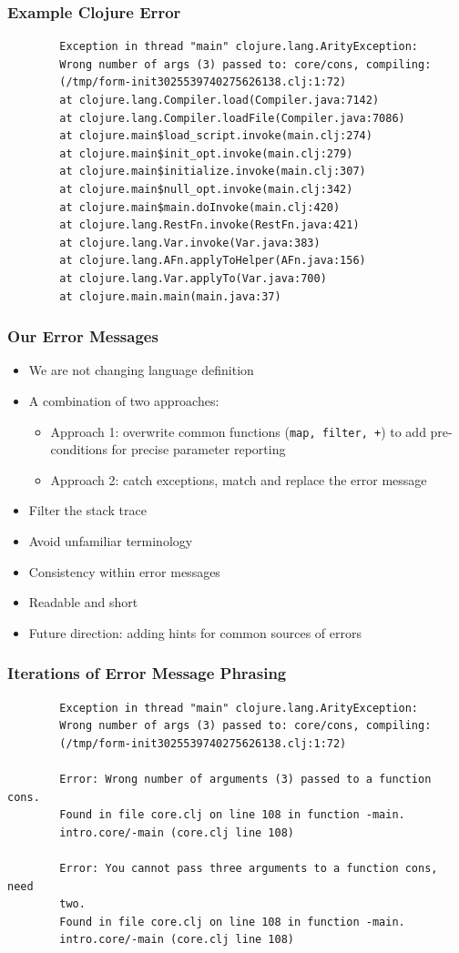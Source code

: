 \documentclass{beamer}
\begin{document}
\begin{frame}[fragile]
\frametitle{Example Clojure Error}
		\begin{verbatim}
		Exception in thread "main" clojure.lang.ArityException:
		Wrong number of args (3) passed to: core/cons, compiling:
		(/tmp/form-init3025539740275626138.clj:1:72)
		at clojure.lang.Compiler.load(Compiler.java:7142)
		at clojure.lang.Compiler.loadFile(Compiler.java:7086)
		at clojure.main$load_script.invoke(main.clj:274)
		at clojure.main$init_opt.invoke(main.clj:279)
		at clojure.main$initialize.invoke(main.clj:307)
		at clojure.main$null_opt.invoke(main.clj:342)
		at clojure.main$main.doInvoke(main.clj:420)
		at clojure.lang.RestFn.invoke(RestFn.java:421)
		at clojure.lang.Var.invoke(Var.java:383)
		at clojure.lang.AFn.applyToHelper(AFn.java:156)
		at clojure.lang.Var.applyTo(Var.java:700)
		at clojure.main.main(main.java:37)
		\end{verbatim}	
\end{frame}



\begin{frame}
	\frametitle{Our Error Messages}
	\begin{itemize}
		\item We are not changing language definition
		\item A combination of two approaches: 
		\begin{itemize}
		\item Approach 1: overwrite common functions ({\tt map, filter, +}) to add pre-conditions for precise parameter reporting
		\item Approach 2: catch exceptions, match and replace the error message	
		\end{itemize}
		\item Filter the stack trace
		\item Avoid unfamiliar terminology
		\item Consistency within error messages
		\item Readable and short
		\item Future direction: adding hints for common sources of errors
	\end{itemize}
\end{frame}

\begin{frame}[fragile]
\frametitle{Iterations of Error Message Phrasing}
	{\small
		\begin{verbatim}
		Exception in thread "main" clojure.lang.ArityException:
		Wrong number of args (3) passed to: core/cons, compiling:
		(/tmp/form-init3025539740275626138.clj:1:72)
		
		Error: Wrong number of arguments (3) passed to a function cons.
		Found in file core.clj on line 108 in function -main.
		intro.core/-main (core.clj line 108)
	
		Error: You cannot pass three arguments to a function cons, need 
		two. 
		Found in file core.clj on line 108 in function -main.
		intro.core/-main (core.clj line 108)
	\end{verbatim}	
	}
\end{frame}
\end{document}
